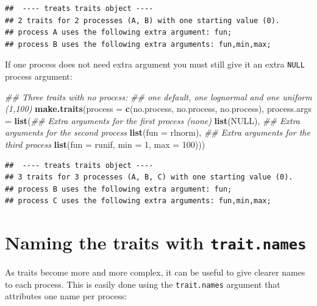\documentclass[
]{book}
\newenvironment{Shaded}{\begin{snugshade}}{\end{snugshade}}
\newcommand{\CommentTok}[1]{\textcolor[rgb]{0.56,0.35,0.01}{\textit{#1}}}
\newcommand{\DataTypeTok}[1]{\textcolor[rgb]{0.13,0.29,0.53}{#1}}
\newcommand{\DecValTok}[1]{\textcolor[rgb]{0.00,0.00,0.81}{#1}}
\newcommand{\KeywordTok}[1]{\textcolor[rgb]{0.13,0.29,0.53}{\textbf{#1}}}
\newcommand{\NormalTok}[1]{#1}
\newcommand{\OtherTok}[1]{\textcolor[rgb]{0.56,0.35,0.01}{#1}}
\begin{document}
\begin{verbatim}
##  ---- treats traits object ---- 
## 2 traits for 2 processes (A, B) with one starting value (0).
## process A uses the following extra argument: fun;
## process B uses the following extra arguments: fun,min,max;
\end{verbatim}

If one process does not need extra argument you must still give it an extra \texttt{NULL} process argument:

\begin{Shaded}
\begin{Highlighting}[]
\CommentTok{\#\# Three traits with no process:}
\CommentTok{\#\# one default, one lognormal and one uniform (1,100)}
\KeywordTok{make.traits}\NormalTok{(}\DataTypeTok{process      =} \KeywordTok{c}\NormalTok{(no.process, no.process, no.process),}
            \DataTypeTok{process.args =} \KeywordTok{list}\NormalTok{(}\CommentTok{\#\# Extra arguments for the first process (none)}
                                \KeywordTok{list}\NormalTok{(}\OtherTok{NULL}\NormalTok{),}
                                \CommentTok{\#\# Extra arguments for the second process}
                                \KeywordTok{list}\NormalTok{(}\DataTypeTok{fun =}\NormalTok{ rlnorm),}
                                \CommentTok{\#\# Extra arguments for the third process}
                                \KeywordTok{list}\NormalTok{(}\DataTypeTok{fun =}\NormalTok{ runif, }\DataTypeTok{min =} \DecValTok{1}\NormalTok{, }\DataTypeTok{max =} \DecValTok{100}\NormalTok{)))}
\end{Highlighting}
\end{Shaded}

\begin{verbatim}
##  ---- treats traits object ---- 
## 3 traits for 3 processes (A, B, C) with one starting value (0).
## process B uses the following extra argument: fun;
## process C uses the following extra arguments: fun,min,max;
\end{verbatim}

\hypertarget{naming-the-traits-with-trait.names}{%
\section{\texorpdfstring{Naming the traits with \texttt{trait.names}}{Naming the traits with trait.names}}\label{naming-the-traits-with-trait.names}}

As traits become more and more complex, it can be useful to give clearer names to each process.
This is easily done using the \texttt{trait.names} argument that attributes one name per process:
\end{document}
